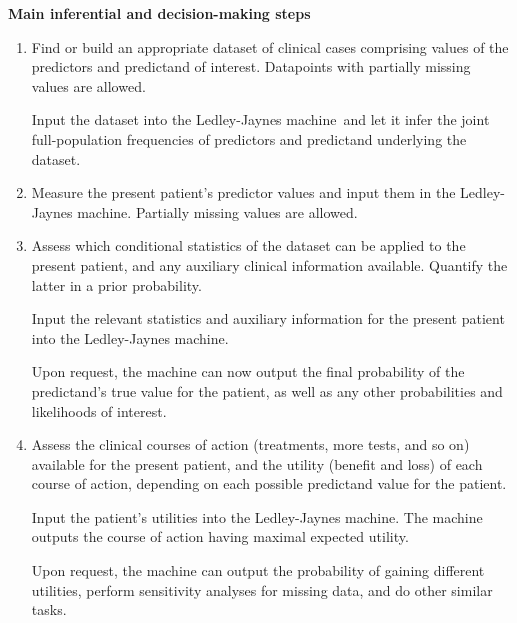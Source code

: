 \documentclass[utf8]{FrontiersinHarvard_mod} %
\renewcommand*{\|}[1][]{\nonscript\:#1\vert\nonscript\:\mathopen{}}
\newcommand*{\ljm}{Ledley-Jaynes machine}
\begin{document}
\begin{table}[b]\centering
    \begin{framed}
      \small
      \caption{\small\bf Main inferential and decision-making steps}\label{tab:main_steps}
      \begin{enumerate}\itemsep1ex
        \setcounter{enumi}{-1}
      \item\label{item:learn} Find or build an appropriate dataset of clinical cases comprising values of the predictors and predictand of interest. Datapoints with partially missing values are allowed.

        Input the dataset into the \ljm\ and let it infer the joint full-population frequencies of predictors and predictand underlying the dataset.

      \item\label{item:predictors} Measure the present patient's predictor values and input them in the \ljm. Partially missing values are allowed.

      \item\label{item:population} Assess which conditional statistics of the dataset can be applied to the present patient, and any auxiliary clinical information available. Quantify the latter in a prior probability.

        Input the relevant statistics and auxiliary information for the present patient into the \ljm. 

        Upon request, the machine can now output the final probability of the predictand's true value for the patient, as well as any other probabilities and likelihoods of interest.
        
      \item\label{item:utilities} Assess the clinical courses of action (treatments, more tests, and so on) available for the present patient, and the utility (benefit and loss) of each course of action, depending on each possible predictand value for the patient.

        Input the patient's utilities into the \ljm. The machine outputs the course of action having maximal expected utility.

        Upon request, the machine can output the probability of gaining different utilities, perform sensitivity analyses for missing data, and do other similar tasks.
      \end{enumerate}
    \end{framed}
\end{table}
\end{document}
